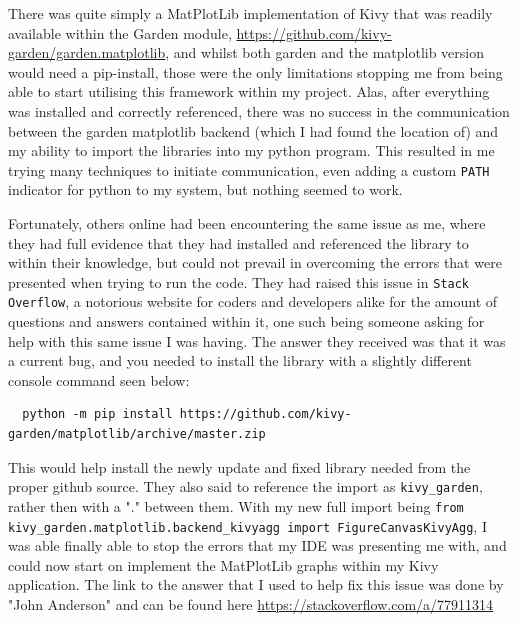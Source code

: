 \documentclass{article}
\begin{document}
There was quite simply a MatPlotLib implementation of Kivy that was readily available within the Garden module, \url{https://github.com/kivy-garden/garden.matplotlib}, and whilst both garden and the matplotlib version would need a pip-install, those were the only limitations stopping me from being able to start utilising this framework within my project. Alas, after everything was installed and correctly referenced, there was no success in the communication between the garden matplotlib backend (which I had found the location of) and my ability to import the libraries into my python program. This resulted in me trying many techniques to initiate communication, even adding a custom \texttt{PATH} indicator for python to my system, but nothing seemed to work. 

Fortunately, others online had been encountering the same issue as me, where they had full evidence that they had installed and referenced the library to within their knowledge, but could not prevail in overcoming the errors that were presented when trying to run the code. They had raised this issue in \texttt{Stack Overflow}, a notorious website for coders and developers alike for the amount of questions and answers contained within it, one such being someone asking for help with this same issue I was having. The answer they received was that it was a current bug, and you needed to install the library with a slightly different console command seen below:\\\vspace{0.3cm}

\begin{verbatim}
  python -m pip install https://github.com/kivy-garden/matplotlib/archive/master.zip
\end{verbatim}

\vspace{0.3cm}
This would help install the newly update and fixed library needed from the proper github source. They also said to reference the import as \texttt{kivy\_garden}, rather then with a "." between them. With my new full import being \texttt{from kivy\_garden.matplotlib.backend\_kivyagg import FigureCanvasKivyAgg}, I was able finally able to stop the errors that my IDE was presenting me with, and could now start on implement the MatPlotLib graphs within my Kivy application. The link to the answer that I used to help fix this issue was done by "John Anderson" and can be found here \url{https://stackoverflow.com/a/77911314}\\\vspace{0.3cm}
\end{document}
